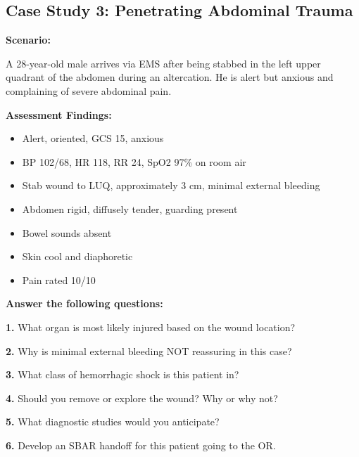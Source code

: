 \documentclass[11pt]{article}
\begin{document}
\newpage
\subsection*{Case Study 3: Penetrating Abdominal Trauma}

\textbf{Scenario:}

A 28-year-old male arrives via EMS after being stabbed in the left upper quadrant of the abdomen during an altercation. He is alert but anxious and complaining of severe abdominal pain.

\textbf{Assessment Findings:}
\begin{itemize}
    \item Alert, oriented, GCS 15, anxious
    \item BP 102/68, HR 118, RR 24, SpO2 97\% on room air
    \item Stab wound to LUQ, approximately 3 cm, minimal external bleeding
    \item Abdomen rigid, diffusely tender, guarding present
    \item Bowel sounds absent
    \item Skin cool and diaphoretic
    \item Pain rated 10/10
\end{itemize}

\vspace{0.5cm}
\textbf{Answer the following questions:}

\textbf{1.} What organ is most likely injured based on the wound location?

\vspace{1.5cm}

\textbf{2.} Why is minimal external bleeding NOT reassuring in this case?

\vspace{1.5cm}

\textbf{3.} What class of hemorrhagic shock is this patient in?

\vspace{1.5cm}

\textbf{4.} Should you remove or explore the wound? Why or why not?

\vspace{1.5cm}

\textbf{5.} What diagnostic studies would you anticipate?

\vspace{1.5cm}

\textbf{6.} Develop an SBAR handoff for this patient going to the OR.
\end{document}
